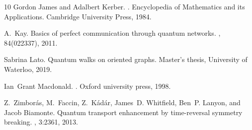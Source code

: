 \documentclass{amsart}
\theoremstyle{plain}
\theoremstyle{remark}\newtheorem{con}[theorem]{Construction}
\theoremstyle{remark} \newtheorem*{remark}{Remark}
\theoremstyle{remark} \newtheorem{example}{Example}
\begin{document}
\begin{thebibliography}{10}
	Gordon James and Adalbert Kerber.
	.
	\newblock Encyclopedia of Mathematics and its Applications. Cambridge
	University Press, 1984.
	
	A.~Kay.
	\newblock Basics of perfect communication through quantum networks.
	, 84(022337), 2011.
	
	Sabrina Lato.
	\newblock Quantum walks on oriented graphs.
	\newblock Master's thesis, University of Waterloo, 2019.
	
	Ian~Grant Macdonald.
	.
	\newblock Oxford university press, 1998.
	
	Z.~Zimbor\'as, M.~Faccin, Z.~K\'ad\'ar, James~D. Whitfield, Ben~P. Lanyon, and
	Jacob Biamonte.
	\newblock Quantum transport enhancement by time-reversal symmetry breaking.
	, 3:2361, 2013.
	
\end{thebibliography}
                    
\end{document}
